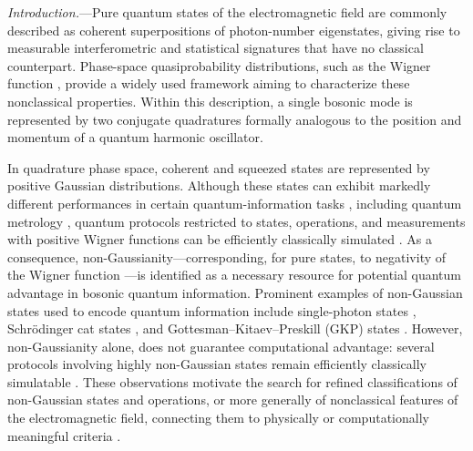 \documentclass[aps,prl,showpacs,twocolumn]{revtex4-2}
\begin{document}
\maketitle

{\it Introduction.}—Pure quantum states of the electromagnetic field are commonly described as coherent superpositions of photon-number eigenstates, giving rise to measurable interferometric and statistical signatures that have no classical counterpart. Phase-space quasiprobability distributions, such as the Wigner function \cite{PhysRev.40.749}, provide a widely used framework aiming to characterize these nonclassical properties. Within this description, a single bosonic mode is represented by two conjugate quadratures formally analogous to the position and momentum of a quantum harmonic oscillator.

In quadrature phase space, coherent and squeezed states are represented by positive Gaussian distributions. Although these states can exhibit markedly different performances in certain quantum-information tasks \cite{RevModPhys.84.621}, including quantum metrology \cite{PhysRevA.98.012114,Maccone2020squeezingmetrology}, quantum protocols restricted to states, operations, and measurements with positive Wigner functions can be efficiently classically simulated \cite{PhysRevLett.109.230503,VeitchEtAl2012,Veitch2014,Bartlett2002,Bartlett2002Efficient,Gross2006Hudsons, Gross, PhysRevA.73.012301}. As a consequence, non-Gaussianity—corresponding, for pure states, to negativity of the Wigner function \cite{HUDSON1974249,Soto:1983avg,Gross2006Hudsons}—is identified as a necessary resource for potential quantum advantage in bosonic quantum information. Prominent examples of non-Gaussian states used to encode quantum information include single-photon states \cite{KLM,RevModPhys.79.135,PhysRevLett.39.691}, Schrödinger cat states \cite{Gilchrist_2004,PhysRevLett.119.030502,PRXQuantum.5.020355}, and Gottesman–Kitaev–Preskill (GKP) states \cite{gottesman_encoding_2001}. However, non-Gaussianity alone, does not guarantee computational advantage: several protocols involving highly non-Gaussian states remain efficiently classically simulatable \cite{Calcluth2022efficientsimulation,PhysRevResearch.3.033018,xmtw-g54f,PhysRevA.110.042402}. These observations motivate the search for refined classifications of non-Gaussian states and operations, or more generally of nonclassical features of the electromagnetic field, connecting them to physically or computationally meaningful criteria \cite{Hahn2025classicalsimulation,PhysRevLett.129.013602,PhysRevLett.123.043601,descamps2024superselectionrules,PhysRevLett.130.090602,PhysRevLett.99.250501}.
\end{document}
